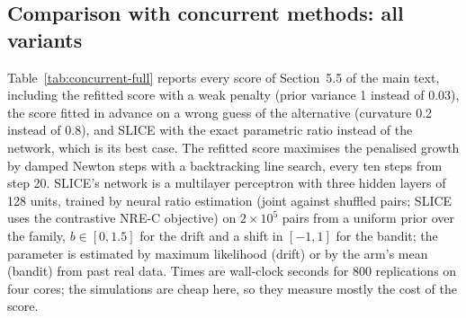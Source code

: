 \documentclass[11pt]{article}
\theoremstyle{remark}
\begin{document}
\subsection{Comparison with concurrent methods: all variants}

Table~\ref{tab:concurrent-full} reports every score of Section~5.5 of the main
text, including the refitted score with a weak penalty (prior variance 1
instead of 0.03), the score fitted in advance on a wrong guess of the
alternative (curvature 0.2 instead of 0.8), and SLICE with the exact
parametric ratio instead of the network, which is its best case. The
refitted score maximises the penalised growth by damped Newton steps with a
backtracking line search, every ten steps from step 20. SLICE's network is a
multilayer perceptron with three hidden layers of 128 units, trained by neural
ratio estimation (joint against shuffled pairs; SLICE uses the contrastive
NRE-C objective) on $2 \times 10^5$ pairs from a uniform prior over the
family, $b \in [0, 1.5]$ for the drift and a shift in $[-1, 1]$ for the bandit;
the parameter is estimated by maximum likelihood (drift) or by the arm's mean
(bandit) from past real data. Times are wall-clock seconds for 800 replications
on four cores; the simulations are cheap here, so they measure mostly the cost
of the score.
\end{document}
